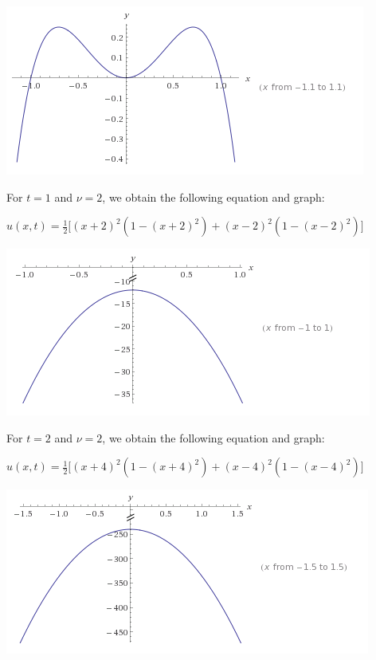 \documentclass[executivepaper]{article}
\begin{document}
\begin{flushleft}
\vspace{3mm}

\includegraphics[scale=0.5]{TEqualToZeroAndVEqualToOne}

\vspace{3mm}

For $t=1$ and $\nu=2$, we obtain the following equation and graph:

\vspace{3mm}

$u(x,t)=\frac{1}{2} \bigg[(x+2)^2(1-(x+2)^2)+(x-2)^2(1-(x-2)^2)\bigg]$

\vspace{3mm}

\includegraphics[scale=0.5]{TEqualToTwoAndVEqualToOne}

\vspace{3mm}

\pagebreak

\vspace*{-40mm}

For $t=2$ and $\nu=2$, we obtain the following equation and graph:

\vspace{3mm}

$u(x,t)=\frac{1}{2} \bigg[(x+4)^2(1-(x+4)^2)+(x-4)^2(1-(x-4)^2)\bigg]$

\vspace{3mm}

\includegraphics[scale=0.5]{TEqualToTwoAndVEqualToTwo}


\end{flushleft}
\end{document}
